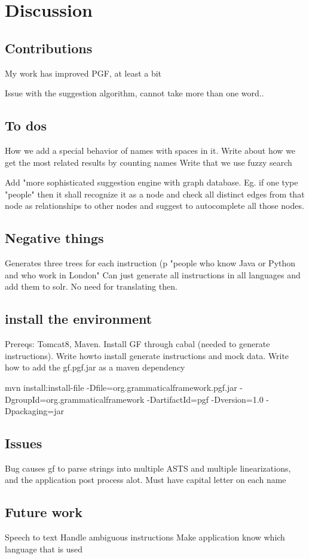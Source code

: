 \chapter{Discussion}\label{ch:discussion}

\section{Contributions}
My work has improved PGF, at least a bit


Issue with the suggestion algorithm, cannot take more than one word..

\section{To dos}
How we add a special behavior of names with spaces in it.
Write about how we get the most related results by counting names
Write that we use fuzzy search


Add "more sophisticated suggestion engine with graph database. Eg. if one type "people" then it shall recognize it as a node and check all distinct edges from that node as relationships to other nodes and suggest to autocomplete all those nodes.
\section{Negative things}
Generates three trees for each instruction (p "people who know Java or Python and who work in London"
Can just generate all instructions in all languages and add them to solr. No need for translating then.

\section{install the environment}
Prereqs: Tomcat8, Maven. Install GF through cabal (needed to generate instructions). Write howto install generate instructions and mock data. Write how to add the gf.pgf.jar as a maven dependency

mvn install:install-file -Dfile=org.grammaticalframework.pgf.jar -DgroupId=org.grammaticalframework -DartifactId=pgf -Dversion=1.0 -Dpackaging=jar

\section{Issues}
Bug causes gf to parse strings into multiple ASTS and multiple linearizations, and the application post process alot.
Must have capital letter on each name

\section{Future work}
Speech to text
Handle ambiguous instructions
Make application know which language that is used